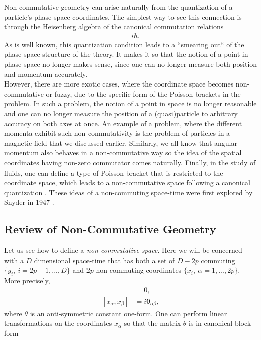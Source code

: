    Non-commutative geometry can arise naturally from the quantization of a particle's phase space coordinates. The simplest way to see this connection is through the Heisenberg algebra of the canonical commutation relations
    \begin{align}
        [\hat{x}, \hat{p}] = i \hbar.
    \end{align}
    As is well known, this quantization condition leads to a ``smearing out`` of the phase space structure of the theory. It makes it so that the notion of a point in phase space no longer makes sense, since one can no longer measure both position and momentum accurately. \\
    \indent However, there are more exotic cases, where the coordinate space becomes non-commutative or fuzzy, due to the specific form of the Poisson brackets in the problem. In such a problem, the notion of a point in space is no longer reasonable and one can no longer measure the position of a (quasi)particle to arbitrary accuracy on both axes at once. An example of a problem, where the different momenta exhibit such non-commutativity is the problem of particles in a magnetic field that we discussed earlier. Similarly, we all know that angular momentum also behaves in a non-commutative way so the idea of the spatial coordinates having non-zero commutator comes naturally. Finally, in the study of fluids, one can define a type of Poisson bracket that is restricted to the coordinate space, which leads to a non-commutative space following a canonical quantization \cite{Jackiw:2002pn}. These ideas of a non-commuting space-time were first explored by Snyder in 1947 \cite{Snyder:1946qz, Snyder:1947nq}.


    \subsection{Review of Non-Commutative Geometry}
    Let us see how to define a \textit{non-commutative space}. Here we will be concerned with a $D$ dimensional space-time that has both a set of $D-2p$ commuting $\{ y_i, \ i=2p+1,...,D\}$ and $2p$ non-commuting coordinates $\{ x_i, \ \alpha =1,...,2p\}$. More precisely,
    \begin{align}
        [y_i, y_j] &=0,\\
        [x_{\alpha}, x_{\beta}] &=i \bm{\theta}_{\alpha \beta}, \label{eq:space_time_commutations}
    \end{align}
    where $\theta$ is an anti-symmetric constant one-form. One can perform linear transformations on the coordinates $x_{\alpha}$ so that the matrix $\theta$ is in canonical block form

